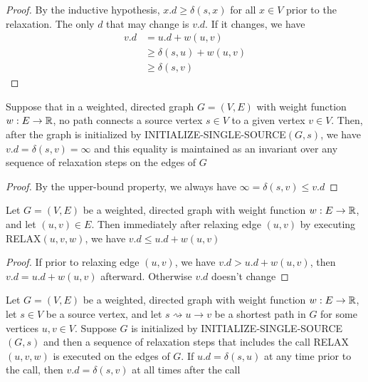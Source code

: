 \documentclass[11pt]{article}
\begin{document}
\begin{proof}
By the inductive hypothesis, \(x.d\ge\delta(s,x)\) for all \(x\in V\) prior to the relaxation. The
only \(d\) that may change is \(v.d\). If it changes, we have
\begin{align*}
v.d&=u.d+w(u,v)\\
&\ge\delta(s,u)+w(u,v)\\
&\ge\delta(s,v)
\end{align*}
\end{proof}

\begin{corollary}
Suppose that in a weighted, directed graph \(G=(V,E)\) with weight function \(w:E\to\mathbb{R}\), no path
connects a source vertex \(s\in V\) to a given vertex \(v\in V\). Then, after the graph is
initialized by INITIALIZE-SINGLE-SOURCE\((G,s)\), we have \(v.d=\delta(s,v)=\infty\) and this equality is
maintained as an invariant over any sequence of relaxation steps on the edges of \(G\)
\end{corollary}

\begin{proof}
By the upper-bound property, we always have \(\infty=\delta(s,v)\le v.d\)
\end{proof}

\begin{lemma}[]
Let \(G=(V,E)\) be a weighted, directed graph with weight function \(w:E\to\mathbb{R}\), and
let \((u,v)\in E\). Then immediately after relaxing edge \((u,v)\) by executing RELAX\((u,v,w)\),
we have \(v.d\le u.d+w(u,v)\)
\end{lemma}

\begin{proof}
If prior to relaxing edge \((u,v)\), we have \(v.d>u.d+w(u,v)\), then \(v.d=u.d+w(u,v)\)
afterward. Otherwise \(v.d\) doesn't change
\end{proof}

\begin{lemma}
Let \(G=(V,E)\) be a weighted, directed graph with weight function \(w:E\to\mathbb{R}\), let \(s\in V\) be a
source vertex, and let \(s\rightsquigarrow u\to v\) be a shortest path in \(G\) for some vertices \(u,v\in V\).
Suppose \(G\) is initialized by INITIALIZE-SINGLE-SOURCE\((G,s)\) and then a sequence of
relaxation steps that includes the call RELAX\((u,v,w)\) is executed on the edges of \(G\).
If \(u.d=\delta(s,u)\) at any time prior to the call, then \(v.d=\delta(s,v)\) at all times after the call
\end{lemma}
\end{document}
